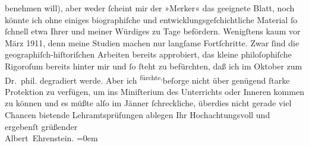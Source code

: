 \begin{ledgroupsized}[t]{13cm}
               benehmen will), aber weder ſcheint mir {\pb}der »Merker« das geeignete Blatt, noch könnte
               ich ohne einiges biographiſche und entwicklungsgeſchichtliche Material ſo ſchnell
               etwa Ihrer und meiner Würdiges zu Tage befördern. Wenigſtens kaum vor März
                  1911, denn meine Studien machen nur langſame Fortſchritte. Zwar ſind die
               geographiſch-hiſtoriſchen Arbeiten bereits approbiert, das kleine philoſophiſche
               Rigoroſum bereits hinter mir und ſo ſteht zu befürchten, daß ich im
                  Oktober zum Dr. phil. degradiert werde. Aber ich \substVorne{}\textsuperscript{fürchte,}{\allowbreak}\substDazwischen{}beſorge\substHinten{} nicht über genügend ſtarke Protektion zu verfügen, um ins Miniſterium des Unterrichts oder Inneren kommen zu können und es müßte alſo im
                  Jänner{ }ſchreckliche, überdies nicht gerade viel Chancen
               bietende Lehramtsprüfungen ablegen\pend
           \pstart
           Ihr Hochachtungsvoll und ergebenſt grüßender{\\[\baselineskip]}\spacefill\mbox{Albert Ehrenstein.}\pend
           \leftskip=0em{}
         
         \endnumbering{}\end{ledgroupsized}  \newcommand{\dateiname}{L01946}\newcommand{\titel}{Albert Ehrenstein an Arthur Schnitzler, 12. 7. 1910}\newcommand{\editorInnen}{Martin Anton Müller und Gerd-Hermann Susen}
      